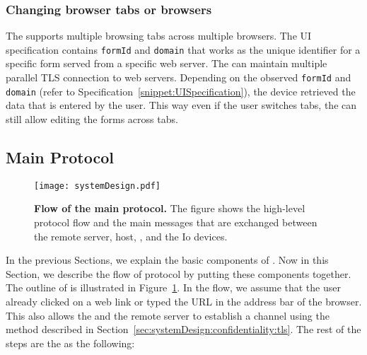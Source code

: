 \subsubsection{Changing browser tabs or browsers}
The \device supports multiple browsing tabs across multiple browsers. The UI specification contains \texttt{formId} and \texttt{domain} that works as the unique identifier for a specific form served from a specific web server. The \device can maintain multiple parallel TLS connection to web servers. Depending on the observed \texttt{formId} and \texttt{domain} (refer to Specification~\ref{snippet:UISpecification}), the device retrieved the data that is entered by the user. This way even if the user switches tabs, the \device can still allow editing the forms across tabs.


\subsection{Main Protocol}
\label{sec:systemDesign:mainProtocol}

\begin{figure}[t]
\centering
\texttt{[image: systemDesign.pdf]}
\caption{\textbf{Flow of the \name main protocol.} The figure shows the high-level protocol flow and the main messages that are exchanged between the remote server, host, \device, and the Io devices.}
\label{fig:systemDesign}
\centering
\end{figure}


In the previous Sections, we explain the basic components of \name. Now in this Section, we describe the flow of \name protocol by putting these components together. The outline of \name is illustrated in Figure~\ref{fig:systemDesign}. In the flow, we assume that the user already clicked on a web link or typed the URL in the address bar of the browser. This also allows the \device and the remote server to establish a \tls channel using the method described in Section~\ref{sec:systemDesign:confidentiality:tls}. The rest of the steps are the as the following:


